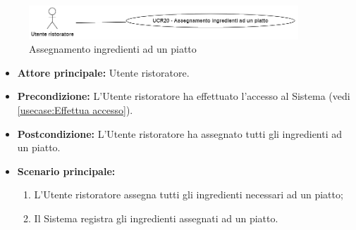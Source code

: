 \newpage
{}
\label{usecase:Assegnamento ingredienti ad un piatto}

\begin{figure}[h]
	\centering
	\includegraphics[width=0.9\textwidth]{./uml/UCR20.png} 
	\caption{Assegnamento ingredienti ad un piatto}
	\label{fig:UCR20}
  \end{figure}

\begin{itemize}
	\item \textbf{Attore principale:} Utente ristoratore.

	\item \textbf{Precondizione:} L'Utente ristoratore ha effettuato l'accesso al Sistema (vedi \autoref{usecase:Effettua accesso}).


	\item \textbf{Postcondizione:}
	      L'Utente ristoratore ha assegnato tutti gli ingredienti ad un piatto.

	\item \textbf{Scenario principale:}
	      \begin{enumerate}
		      \item L'Utente ristoratore assegna tutti gli ingredienti necessari ad un piatto;

		      \item Il Sistema registra gli ingredienti assegnati ad un piatto.
        \end{enumerate}
\end{itemize}
